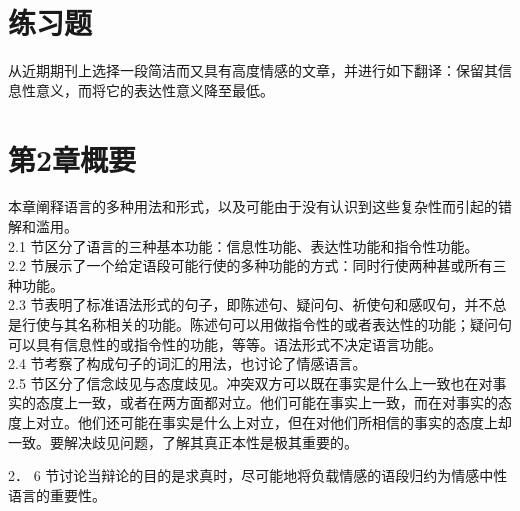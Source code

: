 \section*{练习题}
从近期期刊上选择一段简洁而又具有高度情感的文章，并进行如下翻译：保留其信息性意义，而将它的表达性意义降至最低。

\section*{第2章概要}
本章阐释语言的多种用法和形式，以及可能由于没有认识到这些复杂性而引起的错解和滥用。\\
2.1 节区分了语言的三种基本功能：信息性功能、表达性功能和指令性功能。\\
2.2 节展示了一个给定语段可能行使的多种功能的方式：同时行使两种甚或所有三种功能。\\
2.3 节表明了标准语法形式的句子，即陈述句、疑问句、祈使句和感叹句，并不总是行使与其名称相关的功能。陈述句可以用做指令性的或者表达性的功能；疑问句可以具有信息性的或指令性的功能，等等。语法形式不决定语言功能。\\
2.4 节考察了构成句子的词汇的用法，也讨论了情感语言。\\
2.5 节区分了信念歧见与态度歧见。冲突双方可以既在事实是什么上一致也在对事实的态度上一致，或者在两方面都对立。他们可能在事实上一致，而在对事实的态度上对立。他们还可能在事实是什么上对立，但在对他们所相信的事实的态度上却一致。要解决歧见问题，了解其真正本性是极其重要的。

2． 6 节讨论当辩论的目的是求真时，尽可能地将负载情感的语段归约为情感中性语言的重要性。

